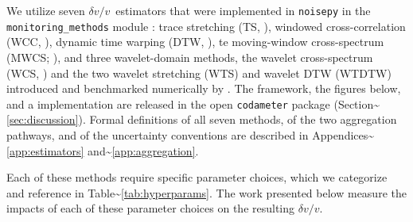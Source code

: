 \documentclass[
  referee]{gji}
\providecommand{\dvv}{\ensuremath{\delta v/v}}
\begin{document}
We utilize seven \dvv~estimators that were implemented in
\texttt{noisepy} in the \texttt{monitoring\_methods} module
\citep{Jiang2020}: trace stretching (TS, \citet{lobkis01}), windowed
cross-correlation (WCC, \citet{poupinet84}), dynamic time warping (DTW,
\citet{Mikesell2015}), te moving-window cross-spectrum (MWCS;
\citet{Clarke2011}), and three wavelet-domain methods, the wavelet
cross-spectrum (WCS, \citet{Mao2020}) and the two wavelet stretching
(WTS) and wavelet DTW (WTDTW) introduced and benchmarked numerically by
\citet{Yuan2021}. The framework, the figures below, and a implementation
are released in the open \texttt{codameter} package
(Section\textasciitilde{}\ref{sec:discussion}). Formal definitions of
all seven methods, of the two aggregation pathways, and of the
uncertainty conventions are described in
Appendices\textasciitilde{}\ref{app:estimators}
and\textasciitilde{}\ref{app:aggregation}.

Each of these methods require specific parameter choices, which we
categorize and reference in Table\textasciitilde{}\ref{tab:hyperparams}.
The work presented below measure the impacts of each of these parameter
choices on the resulting \dvv.
\end{document}
